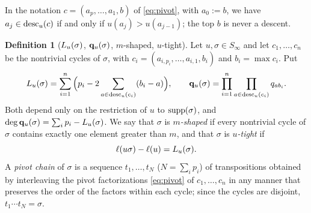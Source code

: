 \documentclass{amsart}
\theoremstyle{definition}
\newtheorem{definition}[lemma]{Definition}
\theoremstyle{remark}
\numberwithin{equation}{section}
\begin{document}
In the notation $c=(a_p,\ldots,a_1,b)$ of \eqref{eq:pivot}, with $a_0:=b$, we have $a_j\in\mathrm{desc}_u(c)$ if and only if $u(a_j)>u(a_{j-1})$; the top $b$ is never a descent.

\begin{definition}[$L_u(\sigma)$, $\mathbf{q}_u(\sigma)$, $m$-shaped, $u$-tight] \label{def:tight}
Let $u,\sigma\in S_\infty$ and let $c_1,\ldots,c_n$ be the nontrivial cycles of $\sigma$, with $c_i=(a_{i,p_i},\ldots,a_{i,1},b_i)$ and $b_i=\max c_i$. Put
$$L_u(\sigma)=\sum_{i=1}^n\Big(p_i-2\sum_{a\in\mathrm{desc}_u(c_i)}(b_i-a)\Big),\qquad \mathbf{q}_u(\sigma)=\prod_{i=1}^n\prod_{a\in\mathrm{desc}_u(c_i)}q_{ab_i}.$$
Both depend only on the restriction of $u$ to $\mathrm{supp}(\sigma)$, and $\deg\mathbf{q}_u(\sigma)=\sum_ip_i-L_u(\sigma)$. We say that $\sigma$ is \emph{$m$-shaped} if every nontrivial cycle of $\sigma$ contains exactly one element greater than $m$, and that $\sigma$ is \emph{$u$-tight} if
$$\ell(u\sigma)-\ell(u)=L_u(\sigma).$$
A \emph{pivot chain} of $\sigma$ is a sequence $t_1,\ldots,t_N$ ($N=\sum_ip_i$) of transpositions obtained by interleaving the pivot factorizations \eqref{eq:pivot} of $c_1,\ldots,c_n$ in any manner that preserves the order of the factors within each cycle; since the cycles are disjoint, $t_1\cdots t_N=\sigma$.
\end{definition}
\end{document}
